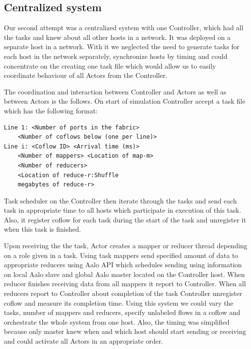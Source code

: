 \documentclass[conference]{IEEEtran}
\begin{document}
\subsection{Centralized system}
Our second attempt was a centralized system with one Controller, which had all the tasks and knew about all other hosts in a network. It was deployed on a separate host in a network. With it we neglected the need to generate tasks for each host in the network separately, synchronize hosts by timing and could concentrate on the creating one task file which would allow us to easily coordinate behaviour of all Actors from the Controller.

The coordination and interaction between Controller and Actors as well as between Actors is the follows. On start of simulation Controller accept a task file which has the following format:

\begin{lstlisting}
Line 1: <Number of ports in the fabric> 
    <Number of coflows below (one per line)>
Line i: <Coflow ID> <Arrival time (ms)>
    <Number of mappers> <Location of map-m> 
    <Number of reducers> 
    <Location of reduce-r:Shuffle
    megabytes of reduce-r>
\end{lstlisting}

Task scheduler on the Controller then iterate through the tasks and send each task in appropriate time to all hosts which participate in execution of this task. Also, it register coflow for each task during the start of the task and unregister it when this task is finished.

Upon receiving the the task, Actor creates a mapper or reducer thread depending on a role given in a task. Using task mappers send specified amount of data to appropriate reducers using Aalo API which schedules sending using information on local Aalo slave and global Aalo master located on the Controller host. When reducer finishes receiving data from all mappers it report to Controller. When all reducers report to Controller about completion of the task Controller unregister coflow and measure its completion time.
Using this system we could vary the tasks, number of mappers and reducers, specify unlabeled flows in a coflow and orchestrate the whole system from one host. Also, the timing was simplified because only master knew when and which host should start sending or receiving and could activate all Actors in an appropriate order. 
\end{document}
